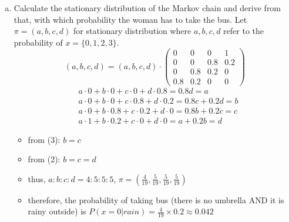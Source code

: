 \documentclass[12pt]{article}
\begin{document}
\begin{flushleft}
\begin{enumerate}[(a)]
\begin{equation*}
\begin{array}{ccccc}
            x_n & 0 & 1 & 2 & 3 \\
            0 & 0 & 0 & 0 & 1 \\
            1 & 0 & 0 & 0.8 & 0.2 \\
            2 & 0 & 0.8 & 0.2 & 0 \\
            3 & 0.8 & 0.2 & 0 & 0
        \end{array}\right)
    \end{equation*}
    \item Calculate the stationary distribution of the Markov chain and derive from that, with which
    probability the woman has to take the bus.
    \newline
    Let $\pi = (a, b, c, d)$ for stationary distribution where $a, b, c, d$ refer to the probability of $x = \{0, 1, 2, 3\}$.
    \newline
    \begin{equation*}
        (a, b, c, d) = (a, b, c, d) \cdot
        \left(\begin{array}{cccc}
            0 & 0 & 0 & 1 \\
            0 & 0 & 0.8 & 0.2 \\
            0 & 0.8 & 0.2 & 0 \\
            0.8 & 0.2 & 0 & 0
        \end{array}\right)
    \end{equation*}
    \begin{align}
        & a \cdot 0 + b \cdot 0 + c \cdot 0 + d \cdot 0.8 = 0.8d = a \\
        & a \cdot 0 + b \cdot 0 + c \cdot 0.8 + d \cdot 0.2 = 0.8c + 0.2d = b \\
        & a \cdot 0 + b \cdot 0.8 + c \cdot 0.2 + d \cdot 0 = 0.8b + 0.2c = c \\
        & a \cdot 1 + b \cdot 0.2 + c \cdot 0 + d \cdot 0 = a + 0.2b = d
    \end{align}
    \newpage
    \begin{itemize}
        \item from (3): $b = c$
        \item from (2): $b = c = d$
        \item thus, $a : b : c : d = 4 : 5 : 5 : 5$, $\pi = (\displaystyle\frac{4}{19}, \displaystyle\frac{5}{19}, \displaystyle\frac{5}{19}, \displaystyle\frac{5}{19})$
        \item therefore, the probability of taking bus (there is no umbrella AND it is rainy outside) is $P(x = 0 | rain) = \displaystyle\frac{4}{19} \times 0.2 \approx 0.042$
    \end{itemize}
\end{enumerate}
\end{flushleft}
\end{document}
